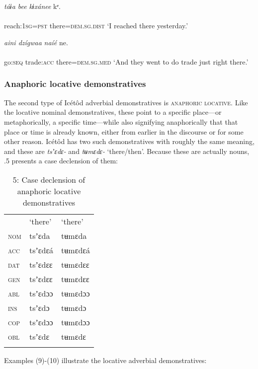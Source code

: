 \ea\label{ex:}
\textit{táɨa bee}     \textit{kɨxánee} kᵉ. \\
    \\
reach:\textsc{1sg}=\textsc{pst}   there=\textsc{dem.sg.dist}
\glt ‘I reached there yesterday.’ 
\z




\ea\label{ex:}
\textit{aini   dzígwaa}   \textit{naíé} ne. \\
    \\
go:\textsc{seq}   trade:\textsc{acc}   there=\textsc{dem.sg.med}
\glt ‘And they went to do trade just right there.’ 
\z




\subsubsection{Anaphoric locative demonstratives}

The second type of Icétôd adverbial demonstratives is \textsc{anaphoric} \textsc{locative}. Like the locative nominal demonstratives, these point to a specific place—or metaphorically, a specific time—while also signifying anaphorically that that place or time is already known, either from earlier in the discourse or for some other reason. Icétôd has two such demonstratives with roughly the same meaning, and these are \textit{tsʼɛdɛ-} and \textit{tʉmɛdɛ-} ‘there/then’. Because these are actually nouns, .5 presents a case declension of them:


\begin{table}
\caption{5: Case declension of anaphoric locative demonstratives}
\label{tab:6}


\begin{tabularx}{\textwidth}{XXX} & ‘there’ & ‘there’\\
\lsptoprule
\textsc{nom} & tsʼɛda & tʉmɛda\\
\textsc{acc} & tsʼɛdɛá & tʉmɛdɛá\\
\textsc{dat} & tsʼɛdɛɛ & tʉmɛdɛɛ\\
\textsc{gen} & tsʼɛdɛɛ & tʉmɛdɛɛ\\
\textsc{abl} & tsʼɛdɔɔ & tʉmɛdɔɔ\\
\textsc{ins} & tsʼɛdɔ & tʉmɛdɔ\\
\textsc{cop} & tsʼɛdɔɔ & tʉmɛdɔɔ\\
\textsc{obl} & tsʼɛdɛ & tʉmɛdɛ\\
\lspbottomrule
\end{tabularx}
\end{table}
Examples (9)-(10) illustrate the locative adverbial demonstratives:




